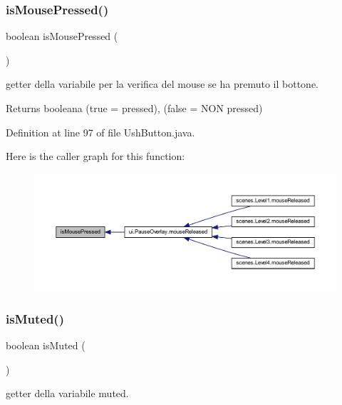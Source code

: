 \subsubsection{\texorpdfstring{is\+Mouse\+Pressed()}{isMousePressed()}}
{\footnotesize\ttfamily boolean is\+Mouse\+Pressed (\begin{DoxyParamCaption}{ }\end{DoxyParamCaption})}



getter della variabile per la verifica del mouse se ha premuto il bottone. 

\begin{DoxyReturn}{Returns}
booleana (true = pressed), (false = N\+ON pressed) 
\end{DoxyReturn}


Definition at line 97 of file Ush\+Button.\+java.

Here is the caller graph for this function\+:\nopagebreak
\begin{figure}[H]
\begin{center}
\leavevmode
\includegraphics[width=350pt]{classui_1_1_ush_button_ad47389f2ab3067af3626db75a6b3b09e_icgraph}
\end{center}
\end{figure}
\mbox{\label{classui_1_1_ush_button_ab67171d139f4fbb66413cb6c42e83945}} 
\subsubsection{\texorpdfstring{is\+Muted()}{isMuted()}}
{\footnotesize\ttfamily boolean is\+Muted (\begin{DoxyParamCaption}{ }\end{DoxyParamCaption})}



getter della variabile muted. 

